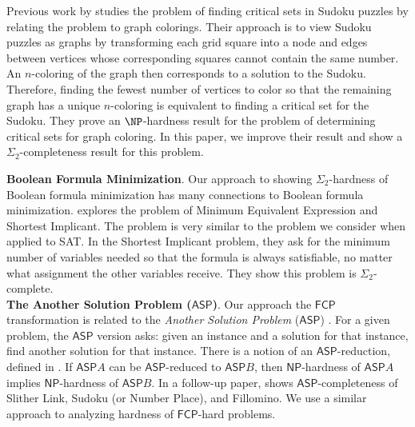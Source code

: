 \documentclass[runningheads,a4paper]{llncs}
\begin{document}
Previous work by \cite{Cooper:2014:CSS:2612293.2612628} studies the problem of finding critical sets in Sudoku puzzles by relating the problem to graph colorings. Their approach is to view Sudoku puzzles as graphs by transforming each grid square into a node and edges between vertices whose corresponding squares cannot contain the same number. An $n$-coloring of the graph then corresponds to a solution to the Sudoku. Therefore, finding the fewest number of vertices to color so that the remaining graph has a unique $n$-coloring is equivalent to finding a critical set for the Sudoku. They prove an $\NP$-hardness result for the problem of determining critical sets for graph coloring. In this paper, we improve their result and show a $\Sigma_2$-completeness result for this problem.
%
%

\noindent\textbf{Boolean Formula Minimization}. Our approach to showing $\Sigma_2$-hardness of Boolean formula minimization has many connections to Boolean formula minimization. \cite{umans}\cite{umans2001minimum} explores the problem of Minimum Equivalent Expression and Shortest Implicant. The problem is very similar to the problem we consider when applied to SAT. In the Shortest Implicant problem, they ask for the minimum number of variables needed so that the formula is always satisfiable, no matter what assignment the other variables receive. They show this problem is $\Sigma_2$-complete.  \\

\noindent\textbf{The Another Solution Problem ($\mathsf{ASP}$)}. Our approach the $\mathsf{FCP}$ transformation is related to the \emph{Another Solution Problem} ($\mathsf{ASP}$) \cite{Seta01}. For a given problem, the $\mathsf{ASP}$ version asks: given an instance and a solution for that instance, find another solution for that instance. There is a notion of an $\mathsf{ASP}$-reduction, defined in \cite{Seta01}. If $\mathsf{ASP} A$ can be $\mathsf{ASP}$-reduced to $\mathsf{ASP} B$, then $\mathsf{NP}$-hardness of $\mathsf{ASP} A$ implies $\mathsf{NP}$-hardness of $\mathsf{ASP} B$. In a follow-up paper, \cite{takayuki2003complexity} shows $\mathsf{ASP}$-completeness of Slither Link, Sudoku (or Number Place), and Fillomino. We use a similar approach to analyzing hardness of $\mathsf{FCP}$-hard problems. 
\end{document}
